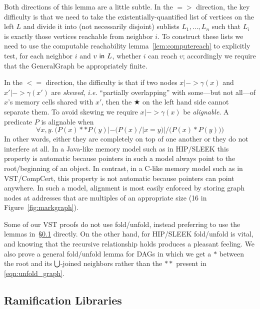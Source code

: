 Both directions of this lemma are a little subtle.  In the $=>$ direction, the key difficulty is that we need to take the existentially-quantified list of vertices on the left $L$ and divide it into (not necessarily disjoint) sublists $L_1, \dots, L_n$ such that $L_i$ is exactly those vertices reachable from neighbor $i$.  To construct these lists we need to use the computable reachability lemma~\ref{lem:computereach} to explicitly test, for each neighbor $i$ and $v\ \mathsf{in}\ L$, whether $i$ can reach $v$; accordingly we require that the GeneralGraph be appropriately finite.

In the $<=$ direction, the difficulty is that if two nodes $x |-> \gamma(x)$ and $x' |-> \gamma(x')$ are \emph{skewed}, \emph{i.e.} ``partially overlapping'' with some---but not all---of $x$'s memory cells shared with $x'$, then the $\bigstar$ on the left hand side cannot separate them.  To avoid skewing we require $x |-> \gamma(x)$ be \emph{alignable}.  A predicate $P$ is alignable when
\[
\forall x,y.~ \Big(P(x) ** P(y) |- \big(P(x) /| x = y\big) |/ \big(P(x) * P(y)\big)\Big)
\]
In other words, either they are completely on top of one another or they do not interfere at all.  In a Java-like memory model such as in HIP/SLEEK this property is automatic because pointers in such a model always point to the root/beginning of an object.  In contrast, in a C-like memory model such as in VST/CompCert, this property is not automatic because pointers can point anywhere.  In such a model, alignment is most easily enforced by storing graph nodes at addresses that are multiples of an appropriate size (16 in Figure~\ref{fig:markgraph}).

Some of our VST proofs do not use fold/unfold, instead preferring to use the lemmas in~\S\ref{sec:ramifylib} directly.  On the other hand, for HIP/SLEEK fold/unfold is vital, and knowing that the recursive relationship holds produces a pleasant feeling.  We also prove a general fold/unfold lemma for DAGs in which we get a $*$ between the root and its $\medocon$-joined neighbors rather than the $**$ present in \eqref{eqn:unfold_graph}.

\subsection{Ramification Libraries}\label{sec:ramifylib}

